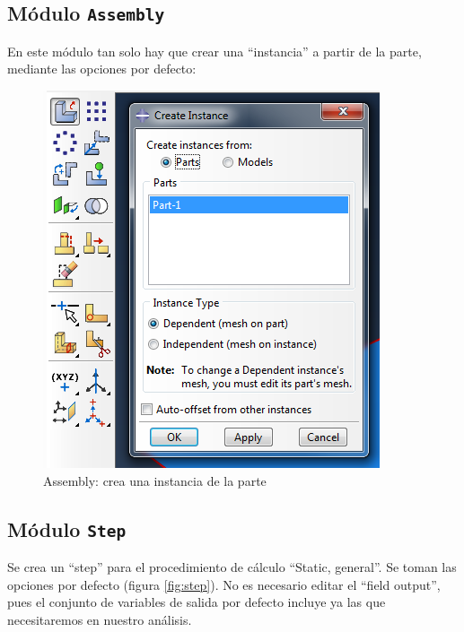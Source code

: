 \documentclass[spanish,a4paper,12pt]{article}
\begin{document}
\subsection{Módulo \texttt{Assembly}}

En este módulo tan solo hay que crear una ``instancia'' a partir de la parte, mediante las opciones por defecto:
\begin{figure}[h!tp]
\centering
\includegraphics[scale=0.4]{capturas/14-assembly.png}
\caption{Assembly: crea una instancia de la parte}
\label{fig:assembly}
\end{figure}

\subsection{Módulo \texttt{Step}}

Se crea un ``step'' para el procedimiento de cálculo ``Static, general''. Se toman las opciones por defecto (figura \ref{fig:step}). 
No es necesario editar el ``field output'', pues el conjunto de variables de salida por defecto incluye ya las que necesitaremos en nuestro análisis.
\end{document}
